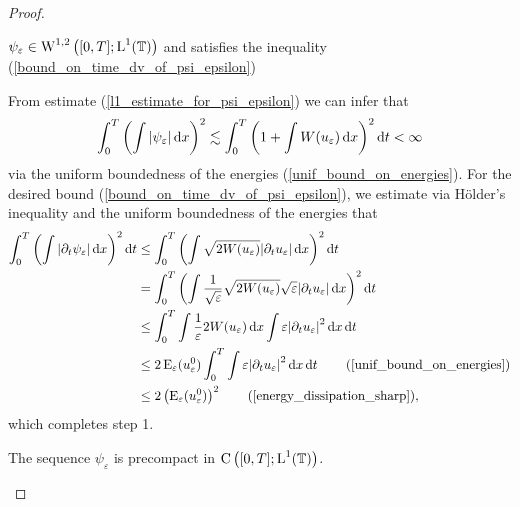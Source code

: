 \begin{proof}
	\begin{description}[wide=0pt]
		\item[Step 1:] $ \psi_{ \varepsilon } \in \operatorname{W}^{ 1 , 2 } \left( [ 0 , T ] ; \operatorname{L}^{ 1 } ( \operatorname{\mathbb{T}} ) \right) $ and satisfies the inequality (\ref{bound_on_time_dv_of_psi_epsilon})
		
		From estimate (\ref{l1_estimate_for_psi_epsilon}) we can infer that
		\begin{equation*}
			\int_{ 0 }^{ T }
			\left(
			\int
			\abs{ \psi_{ \varepsilon } }
			\dd{ x }
			\right)^{ 2 }
			\lesssim
			\int_{ 0 }^{ T }
			\left(
			1 + \int W ( u_{ \varepsilon } ) \dd{ x }
			\right)^{ 2 }
			\dd{ t } 
			<
			\infty
		\end{equation*}
		via the uniform boundedness of the energies (\ref{unif_bound_on_energies}). For the desired bound (\ref{bound_on_time_dv_of_psi_epsilon}), we estimate via Hölder's inequality and the uniform boundedness of the energies that
		\begin{align*}
			\int_{ 0 }^{ T }
			\left(
			\int
			\abs{ 
				\partial_{ t } \psi_{ \varepsilon }
			}
			\dd{ x }
			\right)^{ 2 }
			\dd{ t }
			& \leq
			\int_{ 0 }^{ T }
			\left(
			\int
			\sqrt{ 2 W ( u_{ \varepsilon } ) }
			\abs{ \partial_{ t } u_{ \varepsilon } }
			\dd{ x }
			\right)^{ 2 }
			\dd{ t }
			\\
			& =
			\int_{ 0 }^{ T }
			\left(
			\int
			\frac{ 1 }{ \sqrt{\varepsilon } } \sqrt{ 2 W ( u_{ \varepsilon } ) }
			\sqrt{ \varepsilon } \abs{ \partial_{ t } u_{ \varepsilon } }
			\dd{ x }
			\right)^{ 2 }
			\dd{ t }
			\\
			& \leq
			\int_{ 0 }^{ T }
			\int
			\frac{ 1 }{ \varepsilon }
			2 W ( u_{ \varepsilon } )
			\dd{ x }
			\int
			\varepsilon
			\abs{ \partial_{ t } u_{ \varepsilon } }^{ 2 }
			\dd{ x }
			\dd{ t }
			\\
			& \leq
			2 \energy_{ \varepsilon } ( u_{ \varepsilon }^{ 0 } )
			\int_{ 0 }^{ T }
			\int
			\varepsilon
			\abs{ \partial_{ t } u_{ \varepsilon } }^{ 2 }
			\dd{ x }
			\dd{ t }
			\tag{\ref{unif_bound_on_energies}}
			\\
			& \leq
			2 \left(\energy_{ \varepsilon } ( u_{ \varepsilon }^{ 0 } )\right)^{ 2 }
			\tag{\ref{energy_dissipation_sharp}},
		\end{align*}
		which completes step 1.
		
		\item[Step 2:] The sequence $ \psi_{ \varepsilon } $ is precompact in $ \operatorname{C} \left( [ 0 , T ] ; \operatorname{L}^{ 1 } ( \operatorname{\mathbb{T}} ) \right) $.
		

\end{description}
\end{proof}
